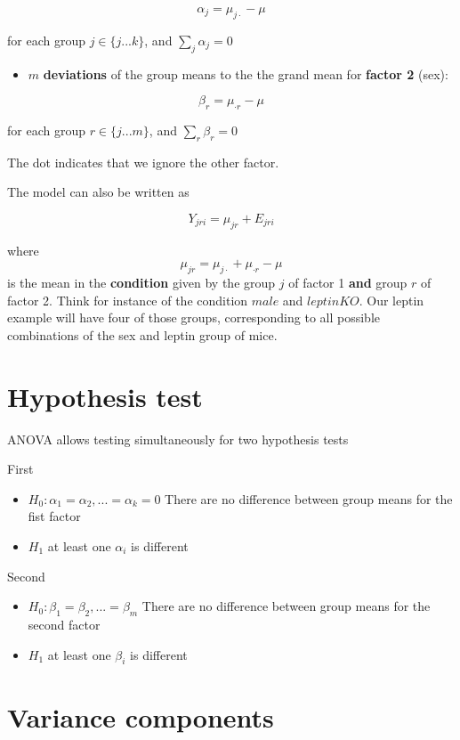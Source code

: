 \documentclass[
]{book}
\providecommand{\tightlist}{%
  \setlength{\itemsep}{0pt}\setlength{\parskip}{0pt}}
\begin{document}
\[\alpha_j=\mu_{j\cdot}-\mu\]

for each group \(j \in\{j...k\}\), and \(\sum_j \alpha_j=0\)

\begin{itemize}
\tightlist
\item
  \(m\) \textbf{deviations} of the group means to the the grand mean for \textbf{factor 2} (sex):
\end{itemize}

\[\beta_r=\mu_{\cdot r}-\mu\]

for each group \(r \in\{j...m\}\), and \(\sum_r \beta_r=0\)

The dot indicates that we ignore the other factor.

The model can also be written as

\[Y_{jri} = \mu_{jr} + E_{jri}\]

where \[\mu_{jr} = \mu_{j \cdot} + \mu_{\cdot r} - \mu\] is the mean in the \textbf{condition} given by the group \(j\) of factor 1 \textbf{and} group \(r\) of factor 2. Think for instance of the condition \(male\) and \(leptinKO\). Our leptin example will have four of those groups, corresponding to all possible combinations of the sex and leptin group of mice.

\hypertarget{hypothesis-test-3}{%
\section{Hypothesis test}\label{hypothesis-test-3}}

ANOVA allows testing simultaneously for two hypothesis tests

First

\begin{itemize}
\item
  \(H_0: \alpha_1=\alpha_2, ...=\alpha_k=0\) There are no difference between group means for the fist factor
\item
  \(H_1\) at least one \(\alpha_i\) is different
\end{itemize}

Second

\begin{itemize}
\item
  \(H_0: \beta_1=\beta_2, ...=\beta_m\) There are no difference between group means for the second factor
\item
  \(H_1\) at least one \(\beta_i\) is different
\end{itemize}

\hypertarget{variance-components}{%
\section{Variance components}\label{variance-components}}
\end{document}

